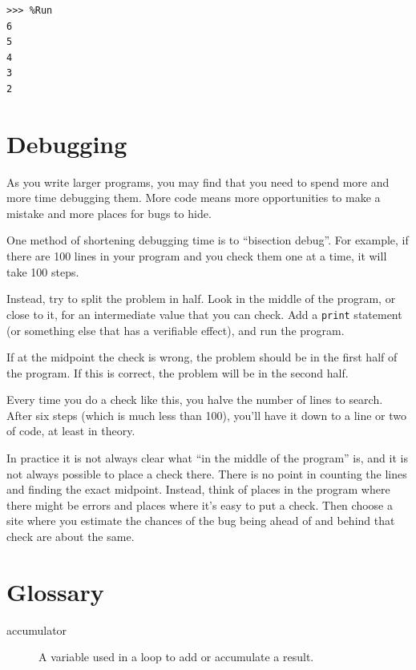 \begin{Verbatim}[frame=single]
>>> %Run
6
5
4
3
2
\end{Verbatim}




\hypertarget{depuraciuxf3n}{%
\section{Debugging}\label{depuraciuxf3n}}


As you write larger programs, you may find that you need to spend more and more time debugging them. More code means more opportunities to make a mistake and more places for bugs to hide.

 

One method of shortening debugging time is to ``bisection debug''. For example, if there are 100 lines in your program and you check them one at a time, it will take 100 steps.

Instead, try to split the problem in half. Look in the middle of the program, or close to it, for an intermediate value that you can check. Add a \texttt{print} statement (or something else that has a verifiable effect), and run the program.

If at the midpoint the check is wrong, the problem should be in the first half of the program. If this is correct, the problem will be in the second half.

Every time you do a check like this, you halve the number of lines to search. After six steps (which is much less than 100), you'll have it down to a line or two of code, at least in theory.

In practice it is not always clear what ``in the middle of the program'' is, and it is not always possible to place a check there. There is no point in counting the lines and finding the exact midpoint. Instead, think of places in the program where there might be errors and places where it's easy to put a check. Then choose a site where you estimate the chances of the bug being ahead of and behind that check are about the same.

\hypertarget{glosario}{%
\section{Glossary}\label{glosario}}

\begin{description}
\item[accumulator]
A variable used in a loop to add or accumulate a result.
\end{description}


